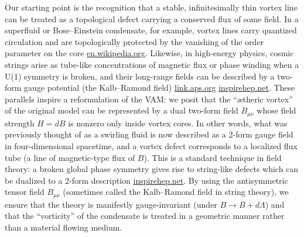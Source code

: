 \documentclass[12pt]{article}
\begin{document}
Our starting point is the recognition that a stable, infinitesimally thin vortex line can be treated as a topological defect carrying a conserved flux of some field. In a superfluid or Bose--Einstein condensate, for example, vortex lines carry quantized circulation and are topologically protected by the vanishing of the order parameter on the core%
\href{https://en.wikipedia.org/wiki/Vortex_ring#:~:text=The%20resulting%20circulation%20Image%3A%20,frac%20%7B7%7D%7B4%7D%7D%5Cright%29%5Cend%7Baligned}{en.wikipedia.org}.
Likewise, in high-energy physics, cosmic strings arise as tube-like concentrations of magnetic flux or phase winding when a U(1) symmetry is broken, and their long-range fields can be described by a two-form gauge potential (the Kalb--Ramond field)%
\href{https://link.aps.org/doi/10.1103/PhysRevD.9.2273#:~:text=Classical%20direct%20interstring%20action,2273}{link.aps.org}%
\href{https://inspirehep.net/literature/124332#:~:text=,2284.%20%E2%80%A2.%20DOI%3A%2010.1103%2FPhysRevD.9.2273}{inspirehep.net}.
These parallels inspire a reformulation of the VAM: we posit that the ``ætheric vortex'' of the original model can be represented by a dual two-form field $B_{\mu\nu}$ whose field strength $H = dB$ is nonzero only inside vortex cores. In other words, what was previously thought of as a swirling fluid is now described as a 2-form gauge field in four-dimensional spacetime, and a vortex defect corresponds to a localized flux tube (a line of magnetic-type flux of $B$). This is a standard technique in field theory: a broken global phase symmetry gives rise to string-like defects which can be dualized to a 2-form description%
\href{https://inspirehep.net/literature/88993#:~:text=Classical%20direct%20interstring%20action,2284.%20DOI}{inspirehep.net}.
By using the antisymmetric tensor field $B_{\mu\nu}$ (sometimes called the Kalb--Ramond field in string theory), we ensure that the theory is manifestly gauge-invariant (under $B \to B + d\Lambda$) and that the ``vorticity'' of the condensate is treated in a geometric manner rather than a material flowing medium.
\end{document}
